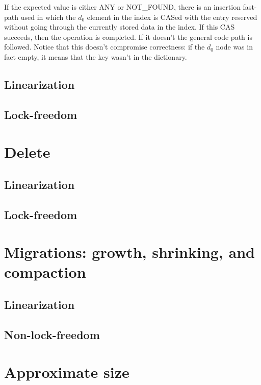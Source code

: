 If the expected value is either ANY or NOT\_FOUND, there is an insertion fast-path used in which the $d_0$ element in the index is CASed with the entry reserved without going through the currently stored data in the index.
If this CAS succeeds, then the operation is completed.
If it doesn't the general code path is followed.
Notice that this doesn't compromise correctness: if the $d_0$ node was in fact empty, it means that the key wasn't in the dictionary.

\subsection{Linearization}
\subsection{Lock-freedom}

\section{Delete}\label{sec:delete}



\subsection{Linearization}
\subsection{Lock-freedom}

\section{Migrations: growth, shrinking, and compaction}\label{sec:migrations}

\subsection{Linearization}
\subsection{Non-lock-freedom}

\section{Approximate size}\label{sec:approximate-size}

